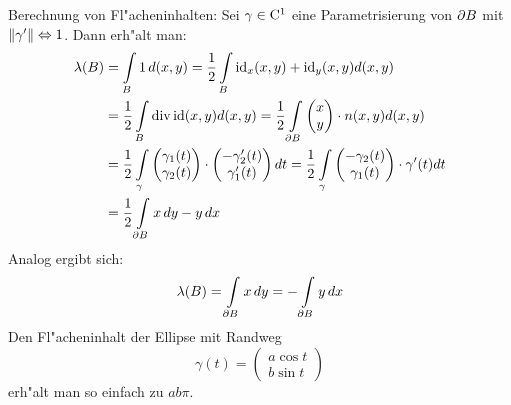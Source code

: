 \remark Berechnung von Fl"acheninhalten:{
  Sei $\gamma\in{\rm C}^1$ eine Parametrisierung von $\partial{B}$ mit 
  $\norm{\gamma'}\ident 1$. Dann erh"alt man:
  \begin{align*}
    \lambda(B) &= \int_B 1\,d(x,y) 
               = \frac 1 2 \int_B \id_x(x,y)+\id_y(x,y)d(x,y) \\
               &= \frac 1 2 \int_B \div \id(x,y) d(x,y) 
               = \frac 1 2 \int_{\partial B} \mat{x\\y}\cdot n(x,y) d(x,y) \\
               &= \frac 1 2 \int_\gamma \mat{\gamma_1(t)\\\gamma_2(t)}\cdot
	          \mat{-\gamma_2'(t)\\ \gamma_1'(t)} dt 
               = \frac 1 2 \int_\gamma \mat{-\gamma_2(t)\\\gamma_1(t)}\cdot
	          \gamma'(t) dt \\
               &= \frac 1 2 \int_{\rim B} x\,dy - y\,dx
    \end{align*}
  Analog ergibt sich:
  \[\lambda(B)=\int_{\rim B} x\,dy=-\int_{\rim B} y\,dx
    \]
  Den Fl"acheninhalt der Ellipse mit Randweg
  \[\gamma(t)=\begin{pmatrix}
      a \cos t \\ b \sin t
      \end{pmatrix}
    \]
  erh"alt man so einfach zu $ab\pi$.
  }
